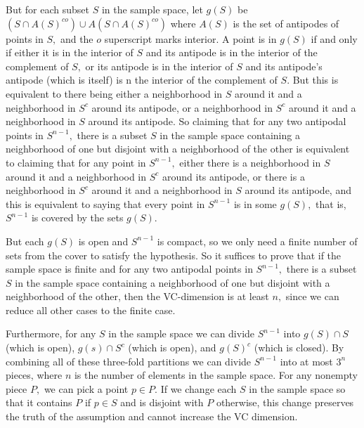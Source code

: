 \documentclass{article}
\begin{document}
But for each subset $S$ in the sample space, let $g(S)$ be $(S \cap A(S)^{co}) \cup A(S \cap A(S)^{co})$ where $A(S)$ is the set of antipodes of points in $S,$ and the $o$ superscript marks interior. A point is in $g(S)$ if and only if either it is in the interior of $S$ and its antipode is in the interior of the complement of $S,$ or its antipode is in the interior of $S$ and its antipode's antipode (which is itself) is n the interior of the complement of $S.$ But this is equivalent to there being either a neighborhood in $S$ around it and a neighborhood in $S^c$ around its antipode, or a neighborhood in $S^c$ around it and a neighborhood in $S$ around its antipode. So claiming that for any two antipodal points in $S^{n - 1},$ there is a subset $S$ in the sample space containing a neighborhood of one but disjoint with a neighborhood of the other is equivalent to claiming that for any point in $S^{n - 1},$ either there is a neighborhood in $S$ around it and a neighborhood in $S^c$ around its antipode, or there is a neighborhood in $S^c$ around it and a neighborhood in $S$ around its antipode, and this is equivalent to saying that every point in $S^{n - 1}$ is in some $g(S),$ that is, $S^{n - 1}$ is covered by the sets $g(S).$

But each $g(S)$ is open and $S^{n - 1}$ is compact, so we only need a finite number of sets from the cover to satisfy the hypothesis. So it suffices to prove that if the sample space is finite and for any two antipodal points in $S^{n - 1},$ there is a subset $S$ in the sample space containing a neighborhood of one but disjoint with a neighborhood of the other, then the VC-dimension is at least $n,$ since we can reduce all other cases to the finite case.

Furthermore, for any $S$ in the sample space we can divide $S^{n - 1}$ into $g(S) \cap S$ (which is open), $g(s) \cap S^c$ (which is open), and $g(S)^c$ (which is closed). By combining all of these three-fold partitions we can divide $S^{n - 1}$ into at most $3^n$ pieces, where $n$ is the number of elements in the sample space. For any nonempty piece $P,$ we can pick a point $p \in P.$ If we change each $S$ in the sample space so that it contains $P$ if $p \in S$ and is disjoint with $P$ otherwise, this change preserves the truth of the assumption and cannot increase the VC dimension.
\end{document}

